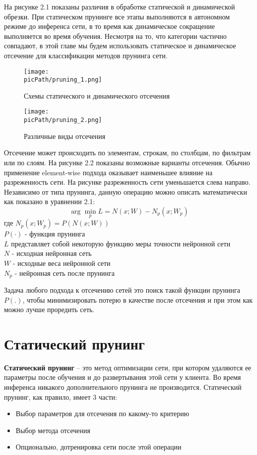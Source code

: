 \documentclass[oneside,final,12pt]{extreport}
\newcommand{\picPath}{images}
\begin{document}
На рисунке 2.1 показаны различия в обработке статической и динамической обрезки. При статическом прунинге все этапы выполняются в автономном режиме до инференса сети, в то время как динамическое сокращение выполняется во время обучения. Несмотря на то, что категории частично совпадают, в этой главе мы будем использовать статическое и динамическое отсечение для классификации методов прунинга сети. 

\begin{figure}[H]
\begin{center}
  \texttt{[image: \\picPath/pruning\_1.png]}
  \caption{Схемы статического и динамического отсечения}
  \label{fig:pruning_1}
  \end{center}
\end{figure}

\begin{figure}[H]
\begin{center}
  \texttt{[image: \\picPath/pruning\_2.png]}
  \caption{Различные виды отсечения}
  \label{fig:pruning_2}
  \end{center}
\end{figure}
Отсечение может происходить по элементам, строкам, по столбцам, по фильтрам или по слоям. На рисунке 2.2 показаны возможные варианты отсечения. Обычно применение element-wise подхода оказывает наименьшее влияние на разреженность сети. На рисунке разреженность сети уменьшается слева направо.
Независимо от типа прунинга, данную операцию можно описать математически как показано в уравнении 2.1:
\begin{equation}
    \arg \min_{p} L = N(x;W) - N_p(x;W_p)
\end{equation}
где $N_p(x;W_p) = P(N(x;W))$\\
$ P(\cdot) $ - функция прунинга\\
$L$ представляет собой некоторую функцию меры точности нейронной сети \\
$N$ - исходная нейронная сеть\\
$W$ - исходные веса нейронной сети\\
$N_p$ - нейронная сеть после прунинга

Задача любого подхода к отсечению сетей это поиск такой функции прунинга $P(.)$, чтобы минимизировать потерю в качестве после отсечения и при этом как можно лучше проредить сеть.

\section{Статический прунинг}
\textbf{Статический прунинг} – это метод оптимизации сети, при котором удаляются ее параметры после обучения и до развертывания этой сети у клиента. Во время инференса никакого дополнительного прунинга не производится. 
Статический прунинг, как правило, имеет 3 части:
\begin{itemize}
    \item Выбор параметров для отсечения по какому-то критерию
    \item Выбор метода отсечения
    \item Опционально, дотренировка сети после этой операции
\end{itemize}
\end{document}
